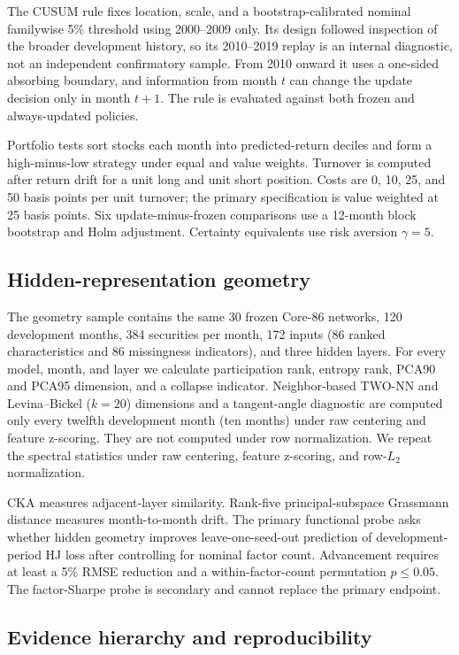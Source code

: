 The CUSUM rule fixes location, scale, and a bootstrap-calibrated nominal familywise 5\% threshold using 2000--2009 only. Its design followed inspection of the broader development history, so its 2010--2019 replay is an internal diagnostic, not an independent confirmatory sample. From 2010 onward it uses a one-sided absorbing boundary, and information from month $t$ can change the update decision only in month $t+1$. The rule is evaluated against both frozen and always-updated policies.

Portfolio tests sort stocks each month into predicted-return deciles and form a high-minus-low strategy under equal and value weights. Turnover is computed after return drift for a unit long and unit short position. Costs are 0, 10, 25, and 50 basis points per unit turnover; the primary specification is value weighted at 25 basis points. Six update-minus-frozen comparisons use a 12-month block bootstrap and Holm adjustment. Certainty equivalents use risk aversion $\gamma=5$.

\subsection{Hidden-representation geometry}

The geometry sample contains the same 30 frozen Core-86 networks, 120 development months, 384 securities per month, 172 inputs (86 ranked characteristics and 86 missingness indicators), and three hidden layers. For every model, month, and layer we calculate participation rank, entropy rank, PCA90 and PCA95 dimension, and a collapse indicator. Neighbor-based TWO-NN and Levina--Bickel ($k=20$) dimensions and a tangent-angle diagnostic are computed only every twelfth development month (ten months) under raw centering and feature z-scoring. They are not computed under row normalization. We repeat the spectral statistics under raw centering, feature z-scoring, and row-$L_2$ normalization.

CKA measures adjacent-layer similarity. Rank-five principal-subspace Grassmann distance measures month-to-month drift. The primary functional probe asks whether hidden geometry improves leave-one-seed-out prediction of development-period HJ loss after controlling for nominal factor count. Advancement requires at least a 5\% RMSE reduction and a within-factor-count permutation $p\leq0.05$. The factor-Sharpe probe is secondary and cannot replace the primary endpoint.

\subsection{Evidence hierarchy and reproducibility}

